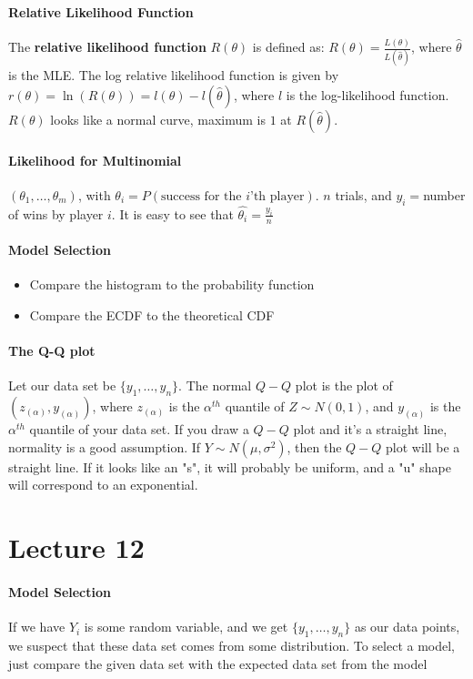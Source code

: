 \documentclass[10pt,letter]{article}
\theoremstyle{plain}
\theoremstyle{definition}
\begin{document}
\paragraph{Relative Likelihood Function}
The \textbf{relative likelihood function} $R(\theta)$ is defined as: $R(\theta)=\frac{L(\theta)}{L(\hat{\theta})}$, where $\hat{\theta}$ is the MLE. The log relative likelihood function is given by $r(\theta)=\ln(R(\theta))=l(\theta)-l(\hat{\theta})$, where $l$ is the log-likelihood function. $R(\theta)$ looks like  a normal curve, maximum is $1$ at $R(\hat{\theta})$. 

\paragraph{Likelihood for Multinomial}
$(\theta_1,\ldots,\theta_m)$, with $\theta_i=P(\text{success for the }i\text{'th player})$. $n$ trials, and $y_i=$number of wins by player $i$. It is easy to see that $\hat{\theta_i}=\frac{y_i}{n}$ 

\paragraph{Model Selection}
\begin{itemize}
    \item Compare the histogram to the probability function 
    \item Compare the ECDF to the theoretical CDF 
\end{itemize}

\paragraph{The Q-Q plot}
Let our data set be $\{y_1,\ldots,y_n\}$. The normal $Q-Q$ plot is the plot of $(z_{(\alpha)},y_{(\alpha)})$, where $z_{(\alpha)}$ is the $\alpha^{th}$ quantile of $Z\sim N(0,1)$, and $y_{(\alpha)}$ is the $\alpha^{th}$ quantile of your data set. If you draw a $Q-Q$ plot and it's a straight line, normality is a good assumption. If $Y\sim N(\mu,\sigma^2)$, then the $Q-Q$ plot will be a straight line. If it looks like an "s", it will probably be uniform, and a "u" shape will correspond to an exponential. 

\section*{Lecture 12}
\paragraph{Model Selection}
If we have $Y_i$ is some random variable, and we get $\{y_1,\ldots,y_n\}$ as our data points, we suspect that these data set comes from some distribution. To select a model, just compare the given data set with the expected data set from the model 
\end{document}
